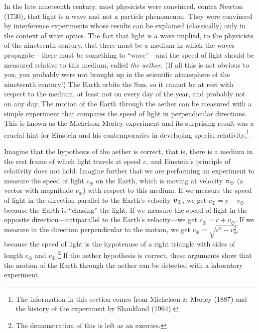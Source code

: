 In the late nineteenth century, most physicists were convinced, contra
Newton (1730), that light is a wave and not a particle phenomenon.
They were convinced by interference experiments whose results can be
explained (classically) only in the context of wave optics.  The fact
that light is a wave implied, to the physicists of the nineteenth
century, that there must be a medium in which the waves
propagate---there must be something to ``wave''---and the speed of
light should be measured relative to this medium, called {\em the
aether.\/} (If all this is not obvious to you, you probably were not
brought up in the scientific atmosphere of the nineteenth century!)
The Earth orbits the Sun, so it cannot be at rest with respect to the
medium, at least not on every day of the year, and probably not on any
day.  The motion of the Earth through the aether can be measured with
a simple experiment that compares the speed of light in perpendicular
directions.  This is known as the Michelson-Morley experiment and its
surprising result was a crucial hint for Einstein and his
contemporaries in developing special relativity.\footnote{The
information in this section comes from Michelson \& Morley (1887) and
the history of the experiment by Shankland (1964).}

Imagine that the hypothesis of the aether is correct, that is, there
is a medium in the rest frame of which light travels at speed $c$, and
Einstein's principle of relativity does not hold.  Imagine further
that we are performing an experiment to measure the speed of light
$c_{\oplus}$ on the Earth, which is moving at velocity
$\mbox{\boldmath $v$}_{\oplus}$ (a vector with magnitude $v_{\oplus}$) with respect
to this medium.  If we measure the speed of light in the direction
parallel to the Earth's velocity $\mbox{\boldmath $v$}_{\oplus}$, we get
$c_{\oplus}=c-v_{\oplus}$ because the Earth is ``chasing'' the light.
If we measure the speed of light in the opposite
direction---antiparallel to the Earth's velocity---we get
$c_{\oplus}=c+v_{\oplus}$.  If we measure in the direction
perpendicular to the motion, we get
$c_{\oplus}=\sqrt{c^2-v_{\oplus}^2}$ because the speed of light is the
hypotenuse of a right triangle with sides of length $c_{\oplus}$ and
$v_{\oplus}$.\footnote{The demonstration of this is left as an
exercise.}  If the aether hypothesis is correct, these arguments show
that the motion of the Earth through the aether can be detected with a
laboratory experiment.

